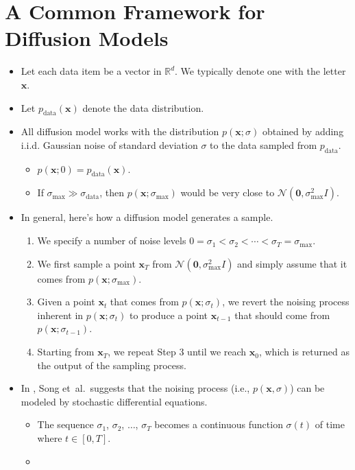 \documentclass[10pt]{article}
\newcommand{\ve}[1]{\mathbf{#1}}
\newcommand{\etal}{{et~al.}}
\newcommand{\mcal}[1]{\mathcal{#1}}
\newcommand{\Real}{\mathbb{R}}
\newcommand{\data}{\mathrm{data}}
\begin{document}
\section{A Common Framework for Diffusion Models}

\begin{itemize}
  \item Let each data item be a vector in $\Real^d$. We typically denote one with the letter $\ve{x}$.
  
  \item Let $p_{\data}(\ve{x})$ denote the data distribution.
  
  \item All diffusion model works with the distribution $p(\ve{x};\sigma)$ obtained by adding i.i.d. Gaussian noise of standard deviation $\sigma$ to the data sampled from $p_{\data}$.
  \begin{itemize}
    \item $p(\ve{x}; 0) = p_{\data}(\ve{x})$.
    \item If $\sigma_{\max} \gg \sigma_{\data}$, then $p(\ve{x};\sigma_{\max})$ would be very close to $\mcal{N}(\ve{0}, \sigma_{\max}^2 I)$.
  \end{itemize}

  \item In general, here's how a diffusion model generates a sample.
  \begin{enumerate}
    \item We specify a number of noise levels $0 = \sigma_1 < \sigma_2 < \dotsb < \sigma_T = \sigma_{\max}$.
    \item We first sample a point $\ve{x}_T$ from $\mcal{N}(\ve{0}, \sigma_{\max}^2 I)$ and simply assume that it comes from $p(\ve{x}; \sigma_{\max})$.
    \item Given a point $\ve{x}_t$ that comes from $p(\ve{x}; \sigma_t)$, we revert the noising process inherent in $p(\ve{x}; \sigma_t)$ to produce a point $\ve{x}_{t-1}$ that should come from $p(\ve{x};\sigma_{t-1})$.
    \item Starting from $\ve{x}_T$, we repeat Step 3 until we reach $\ve{x}_0$, which is returned as the output of the sampling process.
  \end{enumerate}

  \item In \cite{Song:2021}, Song \etal\ suggests that the noising process (i.e., $p(\ve{x}, \sigma)$) can be modeled by stochastic differential equations.
  \begin{itemize}
    \item The sequence $\sigma_1$, $\sigma_2$, $\dotsc$, $\sigma_T$ becomes a continuous function $\sigma(t)$ of time where $t \in [0,T]$.
    \item 
  \end{itemize}
\end{itemize}


  
\end{document}
